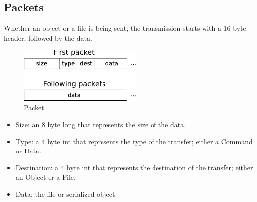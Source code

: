 \documentclass[11pt]{article}
\begin{document}
	\subsection{Packets}
	Whether an object or a file is being sent, the transmission starts with a 16-byte header, followed by the data.
	\begin{figure}[H]
	\centering
	\includegraphics[width=60mm]{img/drawing4.eps}
	\caption[Packet]{Packet}
	\label{drawing4}
	\end{figure}
	\begin{itemize}
		\item Size: an 8 byte long that represents the size of the data.
		\item Type: a 4 byte int that represents the type of the transfer; either a Command or Data.
		\item Destination: a 4 byte int that represents the destination of the transfer; either an Object or a File.
		\item Data: the file or serialized object.
	\end{itemize}
\end{document}

